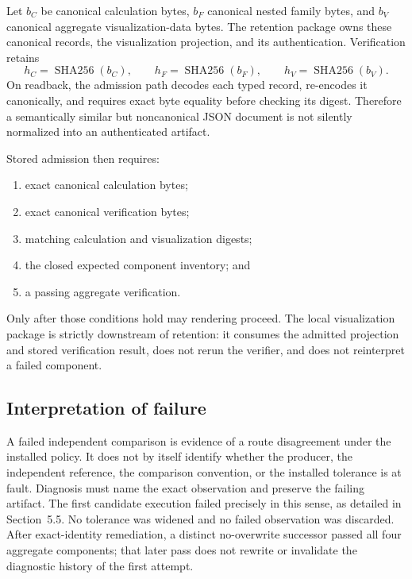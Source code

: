 Let $b_C$ be canonical calculation bytes, $b_F$ canonical nested family bytes, and $b_V$
canonical aggregate visualization-data bytes.  The retention package owns these canonical
records, the visualization projection, and its authentication.  Verification retains
\begin{equation}
 h_C=\operatorname{SHA256}(b_C),\qquad
 h_F=\operatorname{SHA256}(b_F),\qquad
 h_V=\operatorname{SHA256}(b_V).
 \label{eq:authenticated-digests}
\end{equation}
On readback, the admission path decodes each typed record, re-encodes it canonically, and
requires exact byte equality before checking its digest.  Therefore a semantically
similar but noncanonical JSON document is not silently normalized into an authenticated
artifact.

Stored admission then requires:
\begin{enumerate}
 \item exact canonical calculation bytes;
 \item exact canonical verification bytes;
 \item matching calculation and visualization digests;
 \item the closed expected component inventory; and
 \item a passing aggregate verification.
\end{enumerate}
Only after those conditions hold may rendering proceed.  The local visualization package
is strictly downstream of retention: it consumes the admitted projection and stored
verification result, does not rerun the verifier, and does not reinterpret a failed
component.

\subsection{Interpretation of failure}

A failed independent comparison is evidence of a route disagreement under the installed
policy.  It does not by itself identify whether the producer, the independent reference,
the comparison convention, or the installed tolerance is at fault.  Diagnosis must name
the exact observation and preserve the failing artifact.  The first candidate execution
failed precisely in this sense, as detailed in Section~5.5.  No tolerance was widened and
no failed observation was discarded.  After exact-identity remediation, a distinct
no-overwrite successor passed all four aggregate components; that later pass does not
rewrite or invalidate the diagnostic history of the first attempt.
